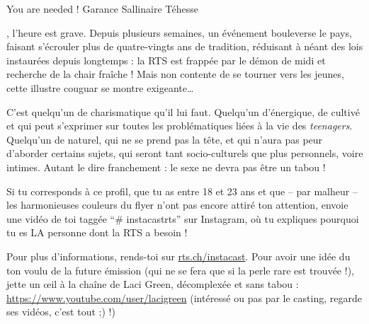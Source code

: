 \newpage






\vspace*{-1.8cm}
\begin{article}
{You are needed !}
{Garance Sallin}{aire Téhesse}

\vspace*{-2mm}
, l’heure est grave. Depuis plusieurs semaines, un événement bouleverse le pays, faisant s’écrouler plus de quatre-vingts ans de tradition, réduisant à néant des lois instaurées depuis longtemps : la RTS est frappée par le démon de midi et recherche de la chair fraîche ! Mais non contente de se tourner vers les jeunes, cette illustre couguar se montre exigeante…

C’est quelqu’un de charismatique qu’il lui faut. Quelqu’un d’énergique, de cultivé et qui peut s’exprimer sur toutes les problématiques liées à la vie des \textit{teenagers}. Quelqu’un de naturel, qui ne se prend pas la tête, et qui n’aura pas peur d’aborder certains sujets, qui seront tant socio-culturels que plus personnels, voire intimes. Autant le dire franchement : le sexe ne devra pas être un tabou !

Si tu corresponds à ce profil, que tu as entre 18 et 23 ans et que -- par malheur -- les harmonieuses couleurs du flyer n’ont pas encore attiré ton attention, envoie une vidéo de toi taggée \enquote{\# instacastrts} sur Instagram, où tu expliques pourquoi tu es LA personne dont la RTS a besoin ! 

Pour plus d’informations, rends-toi sur \url{rts.ch/instacast}. 
Pour avoir une idée du ton voulu de la future émission (qui ne se fera que si la perle rare est trouvée !), jette un œil à la chaîne de Laci Green, décomplexée et sans tabou : \url{https://www.youtube.com/user/lacigreen} (intéressé ou pas par le casting, regarde ses vidéos, c’est tout ;) !)

\end{article}

\ligne




